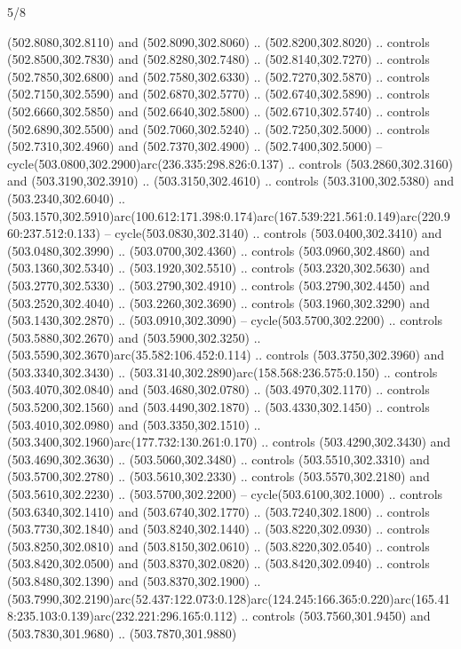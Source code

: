 \begin{flagdescription}{5/8}
\begin{scope}[xshift=0.5\flaglength,yshift=0.5\flagwidth,scale=\flagwidth/475.63]
\begin{scope}[y=0.8pt, x=0.8pt, yscale=-1, xscale=1,shift={(-450,-300)}]
\begin{scope}[cm={{1.0,0.0,0.0,1.0,(-0.0002,0.12556)}},cm={{1.0,0.0,0.0,1.0,(0.00179,0.0)}}]
\begin{scope}[cm={{1.11592,0.0,0.0,1.11592,(-106.89933,-41.77764)}}]
\begin{scope}[draw=black,fill=cfff]
\begin{scope}[fill=black]
  (502.8080,302.8110) and (502.8090,302.8060) .. (502.8200,302.8020) .. controls
  (502.8500,302.7830) and (502.8280,302.7480) .. (502.8140,302.7270) .. controls
  (502.7850,302.6800) and (502.7580,302.6330) .. (502.7270,302.5870) .. controls
  (502.7150,302.5590) and (502.6870,302.5770) .. (502.6740,302.5890) .. controls
  (502.6660,302.5850) and (502.6640,302.5800) .. (502.6710,302.5740) .. controls
  (502.6890,302.5500) and (502.7060,302.5240) .. (502.7250,302.5000) .. controls
  (502.7310,302.4960) and (502.7370,302.4900) .. (502.7400,302.5000) --
  cycle(503.0800,302.2900)arc(236.335:298.826:0.137) .. controls
  (503.2860,302.3160) and (503.3190,302.3910) .. (503.3150,302.4610) .. controls
  (503.3100,302.5380) and (503.2340,302.6040) ..
  (503.1570,302.5910)arc(100.612:171.398:0.174)arc(167.539:221.561:0.149)arc(220.960:237.512:0.133)
  -- cycle(503.0830,302.3140) .. controls (503.0400,302.3410) and
  (503.0480,302.3990) .. (503.0700,302.4360) .. controls (503.0960,302.4860) and
  (503.1360,302.5340) .. (503.1920,302.5510) .. controls (503.2320,302.5630) and
  (503.2770,302.5330) .. (503.2790,302.4910) .. controls (503.2790,302.4450) and
  (503.2520,302.4040) .. (503.2260,302.3690) .. controls (503.1960,302.3290) and
  (503.1430,302.2870) .. (503.0910,302.3090) -- cycle(503.5700,302.2200) ..
  controls (503.5880,302.2670) and (503.5900,302.3250) ..
  (503.5590,302.3670)arc(35.582:106.452:0.114) .. controls (503.3750,302.3960)
  and (503.3340,302.3430) .. (503.3140,302.2890)arc(158.568:236.575:0.150) ..
  controls (503.4070,302.0840) and (503.4680,302.0780) .. (503.4970,302.1170) ..
  controls (503.5200,302.1560) and (503.4490,302.1870) .. (503.4330,302.1450) ..
  controls (503.4010,302.0980) and (503.3350,302.1510) ..
  (503.3400,302.1960)arc(177.732:130.261:0.170) .. controls (503.4290,302.3430)
  and (503.4690,302.3630) .. (503.5060,302.3480) .. controls (503.5510,302.3310)
  and (503.5700,302.2780) .. (503.5610,302.2330) .. controls (503.5570,302.2180)
  and (503.5610,302.2230) .. (503.5700,302.2200) -- cycle(503.6100,302.1000) ..
  controls (503.6340,302.1410) and (503.6740,302.1770) .. (503.7240,302.1800) ..
  controls (503.7730,302.1840) and (503.8240,302.1440) .. (503.8220,302.0930) ..
  controls (503.8250,302.0810) and (503.8150,302.0610) .. (503.8220,302.0540) ..
  controls (503.8420,302.0500) and (503.8370,302.0820) .. (503.8420,302.0940) ..
  controls (503.8480,302.1390) and (503.8370,302.1900) ..
  (503.7990,302.2190)arc(52.437:122.073:0.128)arc(124.245:166.365:0.220)arc(165.418:235.103:0.139)arc(232.221:296.165:0.112)
  .. controls (503.7560,301.9450) and (503.7830,301.9680) .. (503.7870,301.9880)

\end{scope}
\end{scope}
\end{scope}
\end{scope}
\end{scope}
\end{scope}
\end{flagdescription}
